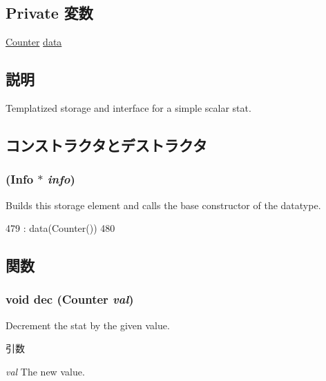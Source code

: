 \subsection*{Private 変数}
\begin{DoxyCompactItemize}
\item 
\hyperlink{namespaceStats_ac35128c026c72bb36af9cea00774e8a6}{Counter} \hyperlink{classStats_1_1StatStor_a81eb27126d778c8c1b33a0e64488b4cf}{data}
\end{DoxyCompactItemize}


\subsection{説明}
Templatized storage and interface for a simple scalar stat. 

\subsection{コンストラクタとデストラクタ}
\hypertarget{classStats_1_1StatStor_a1f249890adfa3148159d8dd36c053caf}{
\subsubsection[{StatStor}]{ ({\bf Info} $\ast$ {\em info})}}
\label{classStats_1_1StatStor_a1f249890adfa3148159d8dd36c053caf}
Builds this storage element and calls the base constructor of the datatype. 


\begin{DoxyCode}
479         : data(Counter())
480     { }
\end{DoxyCode}


\subsection{関数}
\hypertarget{classStats_1_1StatStor_a89d7b0cf8f0932a96f6728d61d5818b1}{
\subsubsection[{dec}]{\setlength{\rightskip}{0pt plus 5cm}void dec ({\bf Counter} {\em val})}}
\label{classStats_1_1StatStor_a89d7b0cf8f0932a96f6728d61d5818b1}
Decrement the stat by the given value. 
\begin{DoxyParams}{引数}
\item[{\em val}]The new value. \end{DoxyParams}



